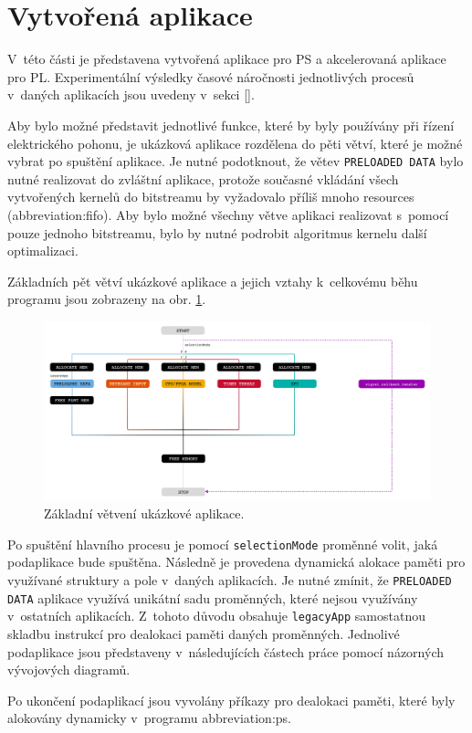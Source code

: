 \documentclass[a4paper, twoside, 11pt]{article}
\newcommand{\fbar}{\FloatBarrier}
\begin{document}
\section{Vytvořená aplikace}\label{sec:vytvorena-aplikace}
 V~této části je představena vytvořená aplikace pro PS a akcelerovaná aplikace pro PL. Experimentální výsledky časové náročnosti jednotlivých procesů v~daných aplikacích jsou uvedeny v~sekci \ref{}.\par
 Aby bylo možné představit jednotlivé funkce, které by byly používány při řízení elektrického pohonu, je ukázková aplikace rozdělena do pěti větví, které je možné vybrat po spuštění aplikace. Je nutné podotknout, že větev \texttt{PRELOADED DATA} bylo nutné realizovat do zvláštní aplikace, protože současné vkládání všech vytvořených kernelů do bitstreamu by vyžadovalo příliš mnoho resources (\gls{abbreviation:fifo}). Aby bylo možné všechny větve aplikaci realizovat s~pomocí pouze jednoho bitstreamu, bylo by nutné podrobit algoritmus kernelu další optimalizaci.\par
 Základních pět větví ukázkové aplikace a jejich vztahy k~celkovému běhu programu jsou zobrazeny na obr. \ref{fig:application-overview}.

 \begin{figure}[htbp!]
	\centering
	\includegraphics[width=1\textwidth]{src/pdf/application-overview.pdf}
	\caption{Základní větvení ukázkové aplikace.}
	\label{fig:application-overview}
\end{figure}
	Po spuštění hlavního procesu je pomocí \texttt{selectionMode} proměnné volit, jaká podaplikace bude spuštěna. Následně je provedena dynamická alokace paměti pro využívané struktury a pole v~daných aplikacích. Je nutné zmínit, že \texttt{PRELOADED DATA} aplikace využívá unikátní sadu proměnných, které nejsou využívány v~ostatních aplikacích. Z~tohoto důvodu obsahuje \texttt{legacyApp} samostatnou skladbu instrukcí pro dealokaci paměti daných proměnných. Jednolivé podaplikace jsou představeny v~následujících částech práce pomocí názorných vývojových diagramů.\par
	Po ukončení podaplikací jsou vyvolány příkazy pro dealokaci paměti, které byly alokovány dynamicky v~programu \gls{abbreviation:ps}.\par
	\fbar
\end{document}

